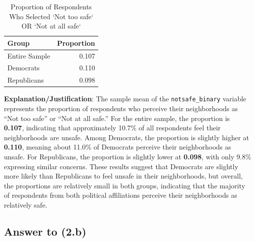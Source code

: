 \documentclass[
  11pt,
]{article}
\begin{document}
\begin{table}

\caption{\label{tab:q2-a}Proportion of Respondents Who Selected `Not too safe` OR `Not at all safe`}
\centering
\begin{tabular}[t]{l|r}
\hline
Group & Proportion\\
\hline
Entire Sample & 0.107\\
\hline
Democrats & 0.110\\
\hline
Republicans & 0.098\\
\hline
\end{tabular}
\end{table}

\textbf{Explanation/Justification}: The sample mean of the
\texttt{notsafe\_binary} variable represents the proportion of
respondents who perceive their neighborhoods as ``Not too safe'' or
``Not at all safe.'' For the entire sample, the proportion is
\textbf{0.107}, indicating that approximately 10.7\% of all respondents
feel their neighborhoods are unsafe. Among Democrats, the proportion is
slightly higher at \textbf{0.110}, meaning about 11.0\% of Democrats
perceive their neighborhoods as unsafe. For Republicans, the proportion
is slightly lower at \textbf{0.098}, with only 9.8\% expressing similar
concerns. These results suggest that Democrats are slightly more likely
than Republicans to feel unsafe in their neighborhoods, but overall, the
proportions are relatively small in both groups, indicating that the
majority of respondents from both political affiliations perceive their
neighborhoods as relatively safe.

\subsection{Answer to (2.b)}\label{answer-to-2.b}
\end{document}
